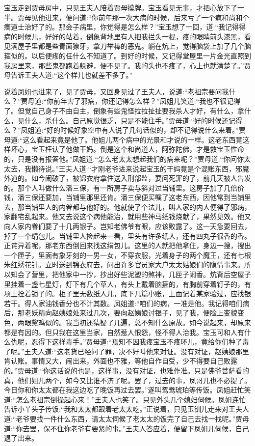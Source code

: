 \begin{parag}
    宝玉走到贾母房中，只见王夫人陪着贾母摸牌。宝玉看见无事，才把心放下了一半。贾母见他进来，便问道:“你前年那一次大病的时候，后来亏了一个疯和尚和个瘸道士治好了的。那会子病里，你觉得是怎么样？”宝玉想了一回，道:“我记得得病的时候儿，好好的站着，倒象背地里有人把我拦头一棍，疼的眼睛前头漆黑，看见满屋子里都是些青面獠牙，拿刀举棒的恶鬼。躺在炕上，觉得脑袋上加了几个脑箍似的。以后便疼的任什么不知道了。到好的时候，又记得堂屋里一片金光直照到我房里来，那些鬼都跑着躲避，便不见了。我的头也不疼了，心上也就清楚了。”贾母告诉王夫人道:“这个样儿也就差不多了。”
\end{parag}


\begin{parag}
    说着凤姐也进来了，见了贾母，又回身见过了王夫人，说道:“老祖宗要问我什么？”贾母道:“你前年害了邪病，你还记得怎么样？”凤姐儿笑道:“我也不很记得了。但觉自己身子不由自主，倒象有些鬼怪拉拉扯扯要我杀人才好，有什么，拿什么，见什么，杀什么。自己原觉很乏，只是不能住手。”贾母道:“好的时候还记得么？”凤姐道:“好的时候好象空中有人说了几句话似的，却不记得说什么来着。”贾母道:“这么看起来竟是他了。他姐儿两个病中的光景和才说的一样。这老东西竟这样坏心，宝玉枉认了他做干妈。倒是这个和尚道人，阿弥陀佛，才是救宝玉性命的，只是没有报答他。”凤姐道:“怎么老太太想起我们的病来呢？”贾母道:“你问你太太去，我懒待说。”王夫人道:“才刚老爷进来说起宝玉的干妈竟是个混账东西，邪魔外道的。如今闹破了，被锦衣府拿住送入刑部监，要问死罪的了，前几天被人告发的。那个人叫做什么潘三保，有一所房子卖与斜对过当铺里。这房子加了几倍价钱，潘三保还要加，当铺里那里还肯。潘三保便买嘱了这老东西，因他常到当铺里去，那当铺里人的内眷都与他好的。他就使了个法儿，叫人家的内人便得了邪病，家翻宅乱起来。他又去说这个病他能治，就用些神马纸钱烧献了，果然见效。他又向人家内眷们要了十几两银子。岂知老佛爷有眼，应该败露了。这一天急要回去，掉了一个绢包儿。当铺里人捡起来一看，里头有许多纸人，还有四丸子很香的香。正诧异着呢，那老东西倒回来找这绢包儿。这里的人就把他拿住，身边一搜，搜出一个匣子，里面有象牙刻的一男一女，不穿衣服，光着身子的两个魔王，还有七根朱红绣花针。立时送到锦衣府去，问出许多官员家大户太太姑娘们的隐情事来。所以知会了营里，把他家中一抄，抄出好些泥塑的煞神，几匣子闹香。炕背后空屋子里挂着一盏七星灯，灯下有几个草人，有头上戴着脑箍的，有胸前穿着钉子的，有项上拴着锁子的。柜子里无数纸人儿，底下几篇小账，上面记着某家验过，应找银若干。得人家油钱香分也不计其数。凤姐道:“咱们的病，一准是他。我记得咱们病后，那老妖精向赵姨娘处来过几次，要向赵姨娘讨银子，见了我，便脸上变貌变色，两眼黧鸡似的。我当初还猜疑了几遍，总不知什么原故。如今说起来，却原来都是有因的。但只我在这里当家，自然惹人恨怨，怪不得人治我。宝玉可和人有什么仇呢，忍得下这样毒手。”贾母道:“焉知不因我疼宝玉不疼环儿，竟给你们种了毒了呢。”王夫人道:“这老货已经问了罪，决不好叫他来对证。没有对证，赵姨娘那里肯认账。事情又大，闹出来，外面也不雅，等他自作自受，少不得要自己败露的。”贾母道:“你这话说的也是，这样事，没有对证，也难作准。只是佛爷菩萨看的真，他们姐儿两个，如今又比谁不济了呢。罢了，过去的事，凤哥儿也不必提了。今日你和你太太都在我这边吃了晚饭再过去罢。”遂叫鸳鸯琥珀等传饭。凤姐赶忙笑道:“怎么老祖宗倒操起心来！”王夫人也笑了。只见外头几个媳妇伺候。凤姐连忙告诉小丫头子传饭:“我和太太都跟着老太太吃。”正说着，只见玉钏儿走来对王夫人道:“老爷要找一件什么东西，请太太伺候了老太太的饭完了自己去找一找呢。”贾母道:“你去罢，保不住你老爷有要紧的事。”王夫人答应着，便留下凤姐儿伺候，自己退了出来。

\end{parag}
